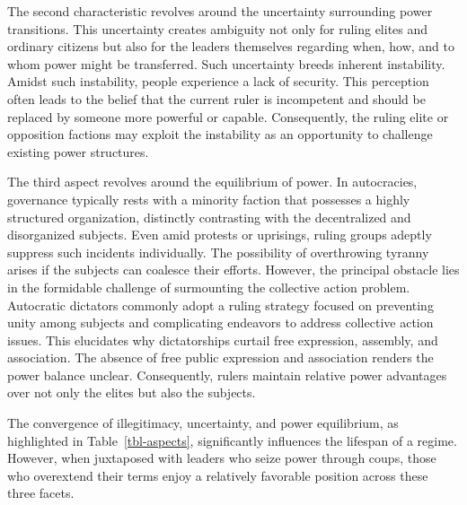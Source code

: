 \documentclass[
  12pt,
  a4paper,
  12pt]{article}
\begin{document}
The second characteristic revolves around the uncertainty surrounding
power transitions. This uncertainty creates ambiguity not only for
ruling elites and ordinary citizens but also for the leaders themselves
regarding when, how, and to whom power might be transferred. Such
uncertainty breeds inherent instability. Amidst such instability, people
experience a lack of security. This perception often leads to the belief
that the current ruler is incompetent and should be replaced by someone
more powerful or capable. Consequently, the ruling elite or opposition
factions may exploit the instability as an opportunity to challenge
existing power structures.

The third aspect revolves around the equilibrium of power. In
autocracies, governance typically rests with a minority faction that
possesses a highly structured organization, distinctly contrasting with
the decentralized and disorganized subjects. Even amid protests or
uprisings, ruling groups adeptly suppress such incidents individually.
The possibility of overthrowing tyranny arises if the subjects can
coalesce their efforts. However, the principal obstacle lies in the
formidable challenge of surmounting the collective action problem.
Autocratic dictators commonly adopt a ruling strategy focused on
preventing unity among subjects and complicating endeavors to address
collective action issues. This elucidates why dictatorships curtail free
expression, assembly, and association. The absence of free public
expression and association renders the power balance unclear.
Consequently, rulers maintain relative power advantages over not only
the elites but also the subjects.

The convergence of illegitimacy, uncertainty, and power equilibrium, as
highlighted in Table~\ref{tbl-aspects}, significantly influences the
lifespan of a regime. However, when juxtaposed with leaders who seize
power through coups, those who overextend their terms enjoy a relatively
favorable position across these three facets.
\end{document}
